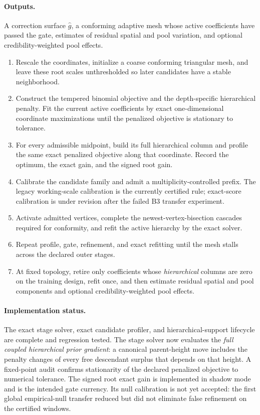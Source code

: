 \documentclass[11pt]{article}
\begin{document}
\paragraph{Outputs.} A correction surface $\hat g$, a conforming adaptive mesh whose active
coefficients have passed the gate, estimates of residual spatial and pool variation, and optional
credibility-weighted pool effects.

\begin{enumerate}[leftmargin=2em,itemsep=2pt]
\item Rescale the coordinates, initialize a coarse conforming triangular mesh, and leave these root
scales unthresholded so later candidates have a stable neighborhood.
\item Construct the tempered binomial objective and the depth-specific hierarchical penalty. Fit the
current active coefficients by exact one-dimensional coordinate maximizations until the penalized
objective is stationary to tolerance.
\item For every admissible midpoint, build its full hierarchical column and profile the same exact
penalized objective along that coordinate. Record the optimum, the exact gain, and the signed root
gain.
\item Calibrate the candidate family and admit a multiplicity-controlled prefix. The legacy
working-scale calibration is the currently certified rule; exact-score calibration is under
revision after the failed B3 transfer experiment.
\item Activate admitted vertices, complete the newest-vertex-bisection cascades required for
conformity, and refit the active hierarchy by the exact solver.
\item Repeat profile, gate, refinement, and exact refitting until the mesh stalls across the declared
outer stages.
\item At fixed topology, retire only coefficients whose \emph{hierarchical} columns are zero on the
training design, refit once, and then estimate residual spatial and pool components and optional
credibility-weighted pool effects.
\end{enumerate}

\paragraph{Implementation status.} The exact stage solver, exact candidate profiler, and
hierarchical-support lifecycle are complete and regression tested. The stage solver now evaluates
the \emph{full coupled hierarchical prior gradient}: a canonical parent-height move includes the
penalty changes of every free descendant surplus that depends on that height. A fixed-point audit
confirms stationarity of the declared penalized objective to numerical tolerance. The signed root
exact gain is implemented in shadow mode and is the intended gate currency. Its null calibration is
not yet accepted: the first global empirical-null transfer reduced but did not eliminate false
refinement on the certified windows.
\end{document}
